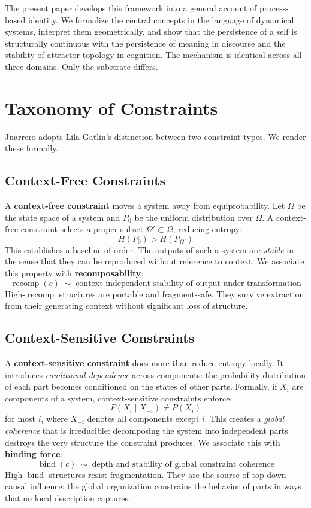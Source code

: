 \documentclass[11pt]{article}
\newcommand{\bind}{\operatorname{bind}}
\newcommand{\recomp}{\operatorname{recomp}}
\begin{document}
The present paper develops this framework into a general account of process-based identity.
We formalize the central concepts in the language of dynamical systems, interpret them
geometrically, and show that the persistence of a self is structurally continuous with the
persistence of meaning in discourse and the stability of attractor topology in cognition.
The mechanism is identical across all three domains. Only the substrate differs.

\section{Taxonomy of Constraints}

Juarrero adopts Lila Gatlin's distinction between two constraint types. We render these
formally.

\subsection{Context-Free Constraints}

A \textbf{context-free constraint} moves a system away from equiprobability. Let $\Omega$
be the state space of a system and $P_0$ be the uniform distribution over $\Omega$.
A context-free constraint selects a proper subset $\Omega' \subset \Omega$, reducing
entropy:
\[
H(P_0) > H(P_{\Omega'})
\]
This establishes a baseline of order. The outputs of such a system are \emph{stable} in
the sense that they can be reproduced without reference to context. We associate this
property with \textbf{recomposability}:
\[
\recomp(c) \;\sim\; \text{context-independent stability of output under transformation}
\]
High-$\recomp$ structures are portable and fragment-safe. They survive extraction from
their generating context without significant loss of structure.

\subsection{Context-Sensitive Constraints}

A \textbf{context-sensitive constraint} does more than reduce entropy locally. It
introduces \emph{conditional dependence} across components: the probability distribution
of each part becomes conditioned on the states of other parts. Formally, if $X_i$ are
components of a system, context-sensitive constraints enforce:
\[
P(X_i \mid X_{-i}) \neq P(X_i)
\]
for most $i$, where $X_{-i}$ denotes all components except $i$. This creates a
\emph{global coherence} that is irreducible: decomposing the system into independent parts
destroys the very structure the constraint produces. We associate this with
\textbf{binding force}:
\[
\bind(c) \;\sim\; \text{depth and stability of global constraint coherence}
\]
High-$\bind$ structures resist fragmentation. They are the source of top-down causal
influence: the global organization constrains the behavior of parts in ways that no
local description captures.
\end{document}
